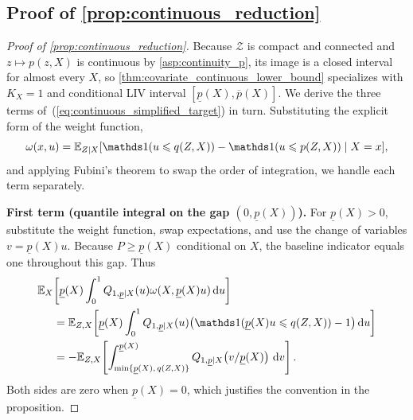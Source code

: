 \subsection{Proof of \cref{prop:continuous_reduction}}\label{app:procedure_fubini}

\begin{proof}[Proof of \cref{prop:continuous_reduction}]
    Because $\mathcal{Z}$ is compact and connected and $z \mapsto p(z,X)$ is continuous by \cref{asp:continuity_p}, its image is a closed interval for almost every $X$, so \cref{thm:covariate_continuous_lower_bound} specializes with $K_X = 1$ and conditional LIV interval $[\underline{p}(X),\overline{p}(X)]$. We derive the three terms of~(\ref{eq:continuous_simplified_target}) in turn. Substituting the explicit form of the weight function,
    \begin{equation*}
        \omega(x,u) = \mathbb{E}_{Z \mid X}[\indicator (u \leqslant q(Z,X)) - \indicator (u \leqslant p(Z,X)) \mid X=x],
    \end{equation*}
    and applying Fubini's theorem to swap the order of integration, we handle each term separately.

    \textbf{First term (quantile integral on the gap $(0,\underline{p}(X))$).} For $\underline{p}(X)>0$, substitute the weight function, swap expectations, and use the change of variables $v=\underline{p}(X)u$. Because $P\ge \underline{p}(X)$ conditional on $X$, the baseline indicator equals one throughout this gap. Thus
    \begin{align*}
        \mathbb{E}_{X}&\!\left[ \underline{p}(X)\int_{0}^{1} Q_{1,\underline p\mid X}(u)\omega(X, \underline{p}(X)u)\, \mathrm{d}u \right] \\
        &= \mathbb{E}_{Z,X}\!\left[ \underline{p}(X)\int_{0}^{1} Q_{1,\underline p\mid X}(u)\big(\indicator (\underline{p}(X)u \leqslant q(Z,X)) - 1\big)\, \mathrm{d}u \right] \\
        &= -\mathbb{E}_{Z,X}\!\left[ \int_{\min\{\underline{p}(X),\,q(Z,X)\}}^{\underline{p}(X)} Q_{1,\underline p\mid X}\!\left({v}/{\underline{p}(X)}\right)\, \mathrm{d}v \right].
    \end{align*}
    Both sides are zero when $\underline{p}(X)=0$, which justifies the convention in the proposition.


\end{proof}
